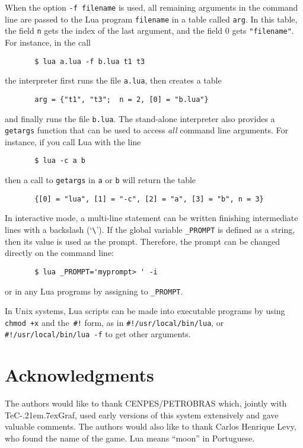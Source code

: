 \documentclass[11pt]{article}
\makeatletter
\newcommand{\T}[1]{{\tt #1}}
\def\tecgraf{{\sf TeC\kern-.21em\lower.7ex\hbox{Graf}}}
\newcommand{\IndexVerb}[1]{\T{#1}\index{#1@{\tt #1}}}
\newcommand{\DefLIB}[1]{\index{#1@{\tt #1}}}
\makeatother
\begin{document}
When the option \T{-f filename} is used,
all remaining arguments in the command line
are passed to the Lua program \verb|filename| in a table called \verb|arg|.
In this table,
the field \verb|n| gets the index of the last argument,
and the field 0 gets \verb|"filename"|.
For instance, in the call
\begin{verbatim}
       $ lua a.lua -f b.lua t1 t3
\end{verbatim}
the interpreter first runs the file \T{a.lua},
then creates a table
\begin{verbatim}
       arg = {"t1", "t3";  n = 2, [0] = "b.lua"}
\end{verbatim}
and finally runs the file \T{b.lua}.
\DefLIB{getargs}
The stand-alone interpreter also provides a \verb|getargs| function that
can be used to access \emph{all} command line arguments.
For instance, if you call Lua with the line
\begin{verbatim}
       $ lua -c a b
\end{verbatim}
then a call to \verb|getargs| in \verb|a| or \verb|b| will return the table
\begin{verbatim}
       {[0] = "lua", [1] = "-c", [2] = "a", [3] = "b", n = 3}
\end{verbatim}

In interactive mode,
a multi-line statement can be written finishing intermediate
lines with a backslash (`\verb|\|').
If the global variable \IndexVerb{_PROMPT} is defined as a string,
then its value is used as the prompt.
Therefore, the prompt can be changed directly on the command line:
\begin{verbatim}
       $ lua _PROMPT='myprompt> ' -i
\end{verbatim}
or in any Lua programs by assigning to \verb|_PROMPT|.

In Unix systems, Lua scripts can be made into executable programs
by using \verb|chmod +x| and the~\verb|#!| form,
as in \verb|#!/usr/local/bin/lua|,
or \verb|#!/usr/local/bin/lua -f| to get other arguments.


\section*{Acknowledgments}

The authors would like to thank CENPES/PETROBRAS which,
jointly with \tecgraf, used early versions of
this system extensively and gave valuable comments.
The authors would also like to thank Carlos Henrique Levy,
who found the name of the game.
Lua means ``moon'' in Portuguese.
\end{document}

